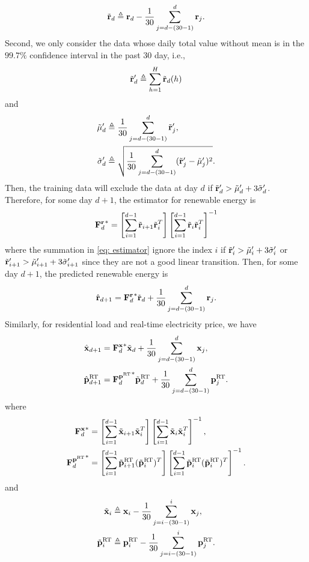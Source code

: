 \begin{equation}
    \tilde{{\mathbf r}}_d \triangleq {\mathbf r}_d - \frac{1}{30}\sum_{j = d-(30-1)}^{d} {\mathbf r}_j.
\end{equation}
Second, we only consider the data whose daily total value without mean is in the $99.7\%$ confidence interval in the past $30$ day, i.e.,
\begin{equation}
    \tilde{{\mathbf r}}'_d \triangleq \sum_{h=1}^{H} \tilde{{\mathbf r}}_d(h)
\end{equation}
and
\begin{align}
    \tilde\mu'_d &\triangleq \frac{1}{30}\sum_{j=d-(30-1)}^{d} \tilde{{\mathbf r}}'_j, \\
    \tilde\sigma'_d &\triangleq \sqrt{\frac{1}{30}\sum_{j=d-(30-1)}^{d}(\tilde{{\mathbf r}}'_j-\tilde\mu'_j)^2}.
\end{align}
Then, the training data will exclude the data at day $d$ if $\tilde{{\mathbf r}}'_d > \tilde\mu'_d+3\tilde\sigma'_d$. Therefore, for some day $d+1$, the estimator for renewable energy is
\begin{equation}\label{eq: estimator}
    {{\mathbf F}^{\mathbf r}_d}^* = \left[\sum_{i=1}^{d-1}\tilde{{\mathbf r}}_{i+1}{\tilde{{\mathbf r}}_{i}}^T\right]\left[\sum_{i=1}^{d-1}\tilde{{\mathbf r}}_{i}{\tilde{{\mathbf r}}_{i}}^T\right]^{-1}
\end{equation}
where the summation in \eqref{eq: estimator} ignore the index $i$ if $\tilde{{\mathbf r}}'_i > \tilde\mu'_i+3\tilde\sigma'_i$ or $\tilde{{\mathbf r}}'_{i+1} > \tilde\mu'_{i+1}+3\tilde\sigma'_{i+1}$ since they are not a good linear transition. Then, for some day $d+1$, the predicted renewable energy is
\begin{equation}
    \hat{{\mathbf r}}_{d+1} = {{\mathbf F}^{\mathbf r}_d}^*\tilde{{\mathbf r}}_d + \frac{1}{30}\sum_{j=d-(30-1)}^{d} {\mathbf r}_j.
\end{equation}
Similarly, for residential load and real-time electricity price, we have
\begin{align}
    \hat{{\mathbf x}}_{d+1} &= {{\mathbf F}^{\mathbf x}_d}^*\tilde{{\mathbf x}}_d + \frac{1}{30}\sum_{j=d-(30-1)}^{d} {\mathbf x}_j, \\
    \hat{{\mathbf p}}^{\text{RT}}_{d+1} &= {{\mathbf F}^{{\mathbf p}^{\text{RT}}}_d}^*\tilde{{\mathbf p}}^{\text{RT}}_d + \frac{1}{30}\sum_{j=d-(30-1)}^{d} {\mathbf p}^{\text{RT}}_j.
\end{align}
where
\begin{align}
    {{\mathbf F}^{\mathbf x}_d}^* &= \left[\sum_{i=1}^{d-1}\tilde{{\mathbf x}}_{i+1}{\tilde{{\mathbf x}}_{i}}^T\right]\left[\sum_{i=1}^{d-1}\tilde{{\mathbf x}}_{i}{\tilde{{\mathbf x}}_{i}}^T\right]^{-1},\\
    {{\mathbf F}^{{\mathbf p}^{\text{RT}}}_d}^* &= \left[\sum_{i=1}^{d-1}\tilde{{\mathbf p}}^{\text{RT}}_{i+1}(\tilde{{\mathbf p}}^{\text{RT}}_i)^T\right]\left[\sum_{i=1}^{d-1}\tilde{{\mathbf p}}^{\text{RT}}_i (\tilde{{\mathbf p}}^{\text{RT}}_i)^T \right]^{-1}.
\end{align}
and
\begin{align}
    \tilde{{\mathbf x}}_i &\triangleq {\mathbf x}_i - \frac{1}{30}\sum_{j = i-(30-1)}^{i} {\mathbf x}_j,\\
    \tilde{{\mathbf p}}^{\text{RT}}_i &\triangleq {\mathbf p}^{\text{RT}}_i - \frac{1}{30}\sum_{j = i-(30-1)}^{i} {\mathbf p}^{\text{RT}}_j.
\end{align}

